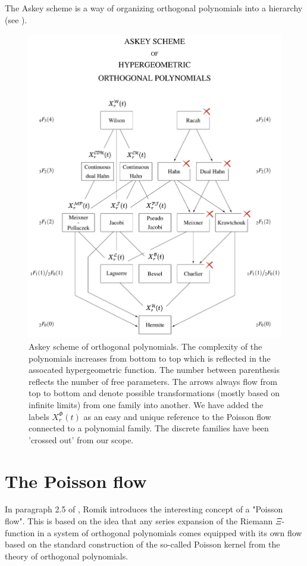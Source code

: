 \documentclass[a4paper,11pt,twoside]{amsart}
\begin{document}
The Askey scheme is a way of organizing orthogonal polynomials into a hierarchy (see \cite{koe}).
\begin{figure}[H]
  \includegraphics[width=1\linewidth]{Askeyschemenew.jpeg}
  \caption{Askey scheme of orthogonal polynomials. The complexity of the polynomials increases from bottom to top which is reflected in the assocated hypergeometric function. The number between parenthesis reflects the number of free parameters. The arrows always flow from top to bottom and denote possible transformations (mostly based on infinite limits) from one family into another. We have added the labels $X_r^{\mathcal{\Phi}}(t)$ as an easy and unique reference to the Poisson flow connected to a polynomial family. The discrete families have been 'crossed out' from our scope.}
  \label{fig:askey}
\end{figure}

\pagebreak
\section{The Poisson flow} \label{poissonflow}
In paragraph 2.5 of \cite{rom}, Romik introduces the interesting concept of a "Poisson flow". This is based on the idea that any series expansion of the Riemann $\Xi$-function in a system of orthogonal polynomials comes equipped with its own flow based on the standard construction of the so-called Poisson kernel from the theory of orthogonal polynomials. 
\end{document}
